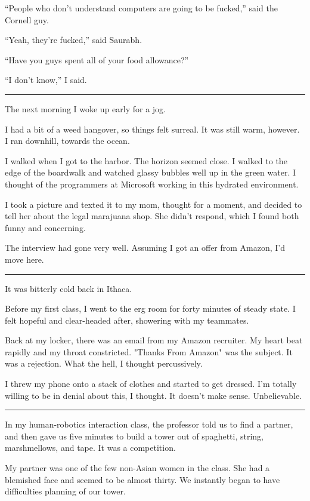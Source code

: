 ``People who don't understand computers are going to be fucked,''
said the Cornell guy.

``Yeah, they're fucked,'' said Saurabh.  

``Have you guys spent all of your food allowance?''

``I don't know,'' I said.

\plainfancybreak{12pt}{2}{* * *}

The next morning I woke up early for a jog.

I had a bit of a weed hangover, so things felt surreal.  It was still warm,
however.  I ran downhill, towards the ocean.

I walked when I got to the harbor.  The horizon seemed close.  I walked to the
edge of the boardwalk and watched glassy bubbles well up in the green water.  I
thought of the programmers at Microsoft working in this hydrated environment. 

I took a picture and texted it to my mom, thought for a moment, and decided to
tell her about the legal marajuana shop.  She didn't respond, which I found both
funny and concerning. 

The interview had gone very well.  Assuming I got an offer from Amazon, I'd move
here. 

\plainfancybreak{12pt}{2}{* * *}

It was bitterly cold back in Ithaca.

Before my first class, I went to the erg room for forty minutes of steady state.
I felt hopeful and clear-headed after, showering with my teammates.

Back at my locker, there was an email from my Amazon recruiter.  My heart beat
rapidly and my throat constricted.  "Thanks From Amazon" was the subject.  It
was a rejection.  What the hell, I thought percussively. 

I threw my phone onto a stack of clothes and started to get dressed.  I'm
totally willing to be in denial about this, I thought.  It doesn't make sense.
Unbelievable. 

\plainfancybreak{12pt}{2}{* * *}

In my human-robotics interaction class, the professor told us to find a partner,
and then gave us five minutes to build a tower out of spaghetti, string,
marshmellows, and tape.  It was a competition.

My partner was one of the few non-Asian women in the class.  She had a blemished
face and seemed to be almost thirty.  We instantly began to have difficulties
planning of our tower.  

